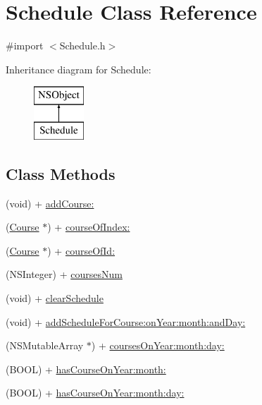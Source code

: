 \hypertarget{interface_schedule}{\section{Schedule Class Reference}
\label{interface_schedule}
}


{\ttfamily \#import $<$Schedule.\+h$>$}

Inheritance diagram for Schedule\+:\begin{figure}[H]
\begin{center}
\leavevmode
\includegraphics[height=2.000000cm]{interface_schedule}
\end{center}
\end{figure}
\subsection*{Class Methods}
\begin{DoxyCompactItemize}
\item 
(void) + \hyperlink{interface_schedule_aaf0faf41937c9aadd2f2ff4d48a1c05c}{add\+Course\+:}
\item 
(\hyperlink{interface_course}{Course} $\ast$) + \hyperlink{interface_schedule_a03e94ae11617def2eab930763bdf12ff}{course\+Of\+Index\+:}
\item 
(\hyperlink{interface_course}{Course} $\ast$) + \hyperlink{interface_schedule_a73f0de53e33bdca11901f0fe114e87a4}{course\+Of\+Id\+:}
\item 
(N\+S\+Integer) + \hyperlink{interface_schedule_a76bd11cfa62f71354bde9e3f7079e2e5}{courses\+Num}
\item 
(void) + \hyperlink{interface_schedule_a0e70c390bb07cd134cbc7f0090ef52b0}{clear\+Schedule}
\item 
(void) + \hyperlink{interface_schedule_a98322100b735481ca7bf493035f11598}{add\+Schedule\+For\+Course\+:on\+Year\+:month\+:and\+Day\+:}
\item 
(N\+S\+Mutable\+Array $\ast$) + \hyperlink{interface_schedule_a61fa3ed66f093a19097af1eb7e030099}{courses\+On\+Year\+:month\+:day\+:}
\item 
(B\+O\+O\+L) + \hyperlink{interface_schedule_a17a17dcc7d2d32962be64766309e4a7f}{has\+Course\+On\+Year\+:month\+:}
\item 
(B\+O\+O\+L) + \hyperlink{interface_schedule_aa38b3bb92219023117fe0686f68fb8bc}{has\+Course\+On\+Year\+:month\+:day\+:}
\end{DoxyCompactItemize}


